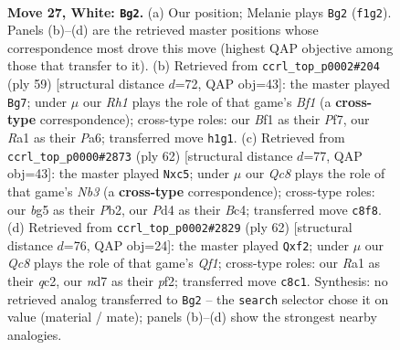 \documentclass[11pt]{article}
\begin{document}
\clearpage

\begin{figure}[p]\centering
\begin{subfigure}{0.46\textwidth}\centering
\resizebox{\linewidth}{!}{%
\newchessgame
\chessboard[
  setfen={2Q5/pp1n2kp/7p/1P4b1/3P2q1/3r4/4N3/R3KB1R w - - 0 27},
  showmover=false,
  pgfstyle=straightmove, color=movearrow, markmove={f1-g2}
]}
\caption{}
\end{subfigure}\hfill
\begin{subfigure}{0.46\textwidth}\centering
\resizebox{\linewidth}{!}{%
\newchessgame
\chessboard[
  setfen={5bk1/5p2/ppp3r1/8/3PQ3/6Bq/PP3P1P/2R4K b - - 1 30},
  showmover=false,
  pgfstyle=straightmove, color=movearrow, markmove={f8-g7}
]}
\caption{}
\end{subfigure}
\\[4pt]
\begin{subfigure}{0.46\textwidth}\centering
\resizebox{\linewidth}{!}{%
\newchessgame
\chessboard[
  setfen={7r/2q2pp1/1k4b1/p1n5/1pB5/1N2Qp2/PP6/K2R4 w - - 2 32},
  showmover=false,
  pgfstyle=straightmove, color=movearrow, markmove={b3-c5}
]}
\caption{}
\end{subfigure}\hfill
\begin{subfigure}{0.46\textwidth}\centering
\resizebox{\linewidth}{!}{%
\newchessgame
\chessboard[
  setfen={2r1kb2/1R1n4/p6p/3Np2P/4P2B/8/P1q2p1K/5Q2 w - - 1 32},
  showmover=false,
  pgfstyle=straightmove, color=movearrow, markmove={f1-f2}
]}
\caption{}
\end{subfigure}
\caption{\textbf{Move 27, White: \texttt{Bg2}.} (a) Our position; Melanie plays \texttt{Bg2} (\texttt{f1g2}). Panels (b)--(d) are the retrieved master positions whose correspondence most drove this move (highest QAP objective among those that transfer to it). (b) Retrieved from \texttt{ccrl\_top\_p0002\#204} (ply 59) [structural distance $d$=72, QAP obj=43]: the master played \texttt{Bg7}; under $\mu$ our \emph{Rh1} plays the role of that game's \emph{Bf1} (a \textbf{cross-type} correspondence); cross-type roles: our \emph{B}f1 as their \emph{P}f7, our \emph{R}a1 as their \emph{P}a6; transferred move \texttt{h1g1}. (c) Retrieved from \texttt{ccrl\_top\_p0000\#2873} (ply 62) [structural distance $d$=77, QAP obj=43]: the master played \texttt{Nxc5}; under $\mu$ our \emph{Qc8} plays the role of that game's \emph{Nb3} (a \textbf{cross-type} correspondence); cross-type roles: our \emph{b}g5 as their \emph{P}b2, our \emph{P}d4 as their \emph{B}c4; transferred move \texttt{c8f8}. (d) Retrieved from \texttt{ccrl\_top\_p0002\#2829} (ply 62) [structural distance $d$=76, QAP obj=24]: the master played \texttt{Qxf2}; under $\mu$ our \emph{Qc8} plays the role of that game's \emph{Qf1}; cross-type roles: our \emph{R}a1 as their \emph{q}c2, our \emph{n}d7 as their \emph{p}f2; transferred move \texttt{c8c1}. Synthesis: no retrieved analog transferred to \texttt{Bg2} -- the \texttt{search} selector chose it on value (material / mate); panels (b)--(d) show the strongest nearby analogies.}
\label{fig:thought-m52}
\end{figure}
\end{document}
